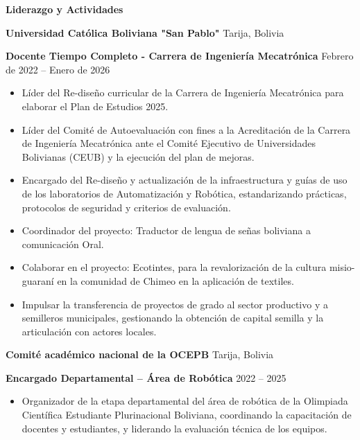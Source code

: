 \documentclass[11pt]{article}
\begin{document}
	\vspace{12pt}
	
	\begin{center}
		\textbf{Liderazgo y Actividades}
	\end{center}
	
	\textbf{Universidad Católica Boliviana "San Pablo"}	\hfill Tarija, Bolivia
	
	\textbf{Docente Tiempo Completo - Carrera de Ingeniería Mecatrónica} \hfill Febrero de 2022 – Enero de 2026
	\begin{itemize}[noitemsep, topsep=0pt, partopsep=0pt, parsep=0pt]
		\item Líder del Re-diseño curricular de la Carrera de Ingeniería Mecatrónica para elaborar el Plan de Estudios 2025.
		\item Líder del Comité de Autoevaluación con fines a la Acreditación de la Carrera de Ingeniería Mecatrónica ante el Comité Ejecutivo de Universidades Bolivianas (CEUB) y la ejecución del plan de mejoras.
		\item Encargado del Re-diseño y actualización de la infraestructura y guías de uso de los laboratorios de Automatización y Robótica, estandarizando prácticas, protocolos de seguridad y criterios de evaluación.
		\item Coordinador del proyecto: Traductor de lengua de señas boliviana a comunicación Oral.
		\item Colaborar en el proyecto: Ecotintes, para la revalorización de la cultura misio-guaraní en la comunidad de Chimeo en la aplicación de textiles.
		\item Impulsar la transferencia de proyectos de grado al sector productivo y a semilleros municipales, gestionando la obtención de capital semilla y la articulación con actores locales.
	\end{itemize}
	
	\vspace{12pt}
	
	\textbf{Comité académico nacional de la OCEPB}	\hfill Tarija, Bolivia
	
	\textbf{Encargado Departamental – Área de Robótica} \hfill 2022 – 2025
	\begin{itemize}[noitemsep, topsep=0pt, partopsep=0pt, parsep=0pt]
		\item Organizador de la etapa departamental del área de robótica de la Olimpiada Científica Estudiante Plurinacional Boliviana, coordinando la capacitación de docentes y estudiantes, y liderando la evaluación técnica de los equipos.
	\end{itemize}
	
\end{document}
